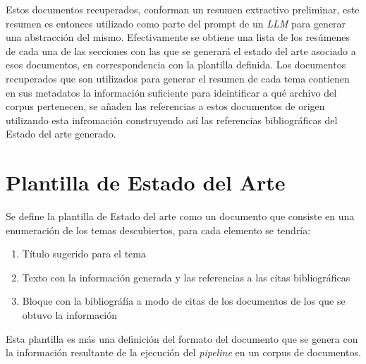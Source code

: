     Estos documentos recuperados, conforman un resumen extractivo preliminar, este resumen es entonces utilizado como parte del prompt de un \emph{LLM} para generar una abstracción del mismo. Efectivamente se obtiene una lista de los resúmenes de cada una de las secciones con las que se generará el estado del arte asociado a esos documentos, en correspondencia con la plantilla definida.
    Los documentos recuperados que son utilizados para generar el resumen de cada tema contienen en sus metadatos la información suficiente para ideintificar a qué archivo del corpus pertenecen, se añaden las referencias a estos documentos de origen utilizando esta infromación construyendo así las referencias bibliográficas del Estado del arte generado.


\section{Plantilla de Estado del Arte}
Se define la plantilla de Estado del arte como un documento que consiste en una enumeración de los temas descubiertos, 
para cada elemento se tendría:
\begin{enumerate}
    \item Título sugerido para el tema
    \item Texto con la información generada y las referencias a las citas bibliográficas
    \item Bloque con la bibliográfía a modo de citas de los documentos de los que se obtuvo la información
\end{enumerate}

Esta plantilla es más una definición del formato del documento que se genera con la información resultante de la ejecución del \emph{pipeline} en un corpus de documentos.
